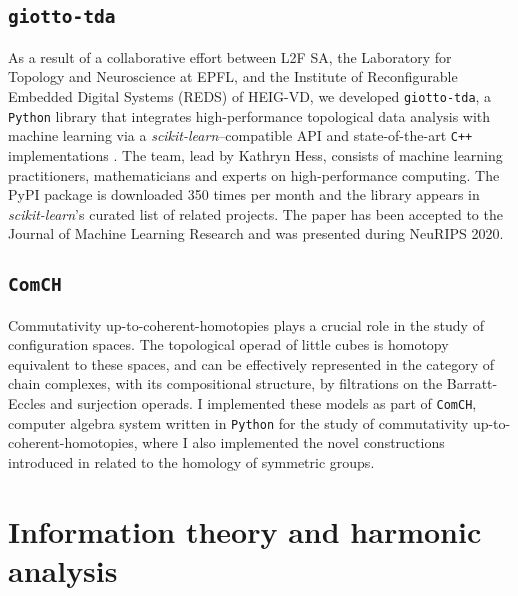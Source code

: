 \subsection{\texttt{giotto-tda}} As a result of a collaborative effort between L2F SA, the Laboratory for Topology and Neuroscience at EPFL, and the Institute of Reconfigurable Embedded Digital Systems (REDS) of HEIG-VD, we developed \texttt{giotto-tda}, a \texttt{Python} library that integrates high-performance topological data analysis with machine learning via a \emph{scikit-learn}--compatible API and state-of-the-art \texttt{C++} implementations \cite{medina2021giotto}.
The team, lead by Kathryn Hess, consists of machine learning practitioners, mathematicians and experts on high-performance computing.
The PyPI package is downloaded 350 times per month and the library appears in \emph{scikit-learn}'s curated list of related projects.
The paper has been accepted to the Journal of Machine Learning Research and was presented during NeuRIPS 2020.

\subsection{\texttt{ComCH}} Commutativity up-to-coherent-homotopies plays a crucial role in the study of configuration spaces.
The topological operad of little cubes is homotopy equivalent to these spaces, and can be effectively represented in the category of chain complexes, with its compositional structure, by filtrations on the Barratt-Eccles and surjection operads.
I implemented these models as part of \texttt{ComCH}, computer algebra system written in \texttt{Python} for the study of commutativity up-to-coherent-homotopies, where I also implemented the novel constructions introduced in \cite{medina2020maysteenrod} related to the homology of symmetric groups.

\section{Information theory and harmonic analysis}

